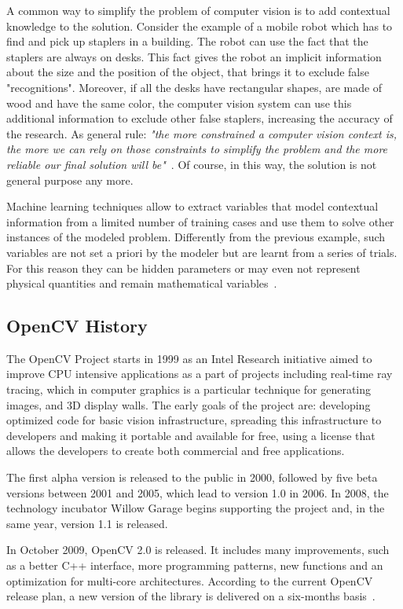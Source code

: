 	A common way to simplify the problem of computer vision is to add contextual knowledge to the solution. 
	Consider the example of a mobile robot which has to find and pick up staplers in a building. The robot can use the fact that the staplers are always on desks. This fact gives the robot an implicit information about the size and the position of the object, that brings it to exclude false "recognitions". Moreover, if all the desks have rectangular shapes, are made of wood and have the same color, the computer vision system can use this additional information to exclude other false staplers, increasing the accuracy of the research. As general rule: \emph{"the more constrained a computer vision context is, the more we can rely on those constraints to simplify the problem and the more reliable our final solution will be"}~\cite[5]{bradski2008learning}. Of course, in this way, the solution is not general purpose any more.
	
	Machine learning techniques allow to extract variables that model contextual information from a limited number of training cases and use them to solve other instances of the modeled problem. 
	Differently from the previous example, such variables are not set a priori by the modeler but are learnt from a series of trials. For this reason they can be hidden parameters or may even not represent physical quantities and remain mathematical variables~\cite{bradski2008learning}.

	\subsection{OpenCV History}
	The \mbox{OpenCV} Project starts in 1999 as an Intel Research initiative aimed to improve CPU intensive applications as a part of projects including real-time ray tracing, which in computer graphics is a particular technique for generating images, and 3D display walls. The early goals of the project are: developing optimized code for basic vision infrastructure, spreading this infrastructure to developers and making it portable and available for free, using a license that allows the developers to create both commercial and free applications.

	The first alpha version is released to the public in 2000, followed by five beta versions between 2001 and 2005, which lead to version 1.0 in 2006. In 2008, the technology incubator Willow Garage begins supporting the project and, in the same year, version 1.1  is released.

	In October 2009, \mbox{OpenCV} 2.0 is released. It includes many improvements, such as a better C++ interface, more programming patterns, new functions and an optimization for multi-core architectures. According to the current \mbox{OpenCV} release plan, a new version of the library is delivered on a six-months basis~\cite{OpenCV:ChangeLogs}.



